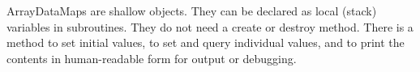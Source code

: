

ArrayDataMaps are shallow objects.  They can be
declared as local (stack) variables in subroutines.
They do not need a create or destroy method.
There is a method to set initial values, to set
and query individual values, and to print the
contents in human-readable form for output or debugging.


